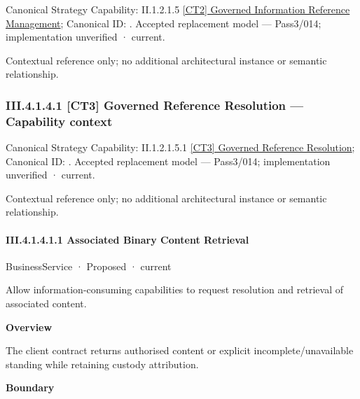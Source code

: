 {\small Canonical Strategy Capability: II.1.2.1.5 \hyperref[element:39205a4164cc4e92b372f182cec834e0]{[CT2] Governed Information Reference Management}; Canonical ID: \texttt{}. Accepted replacement model — Pass3/014; implementation unverified · current.}\par
Contextual reference only; no additional architectural instance or semantic relationship.\par
\subsubsection*{III.4.1.4.1 [CT3] Governed Reference Resolution — Capability context}
\label{navigation:III.4.1.4.1}

{\small Canonical Strategy Capability: II.1.2.1.5.1 \hyperref[element:56183735ff404e0e94d54df936b008cf]{[CT3] Governed Reference Resolution}; Canonical ID: \texttt{}. Accepted replacement model — Pass3/014; implementation unverified · current.}\par
Contextual reference only; no additional architectural instance or semantic relationship.\par
\paragraph*{III.4.1.4.1.1 Associated Binary Content Retrieval}
\label{navigation:III.4.1.4.1.1}

\label{element:f0e0c03e407e4534b9e422df103fc35f}
{\small BusinessService · Proposed · current}\par

Allow information-consuming capabilities to request resolution and retrieval of associated content.



\textbf{Overview}



The client contract returns authorised content or explicit incomplete/unavailable standing while retaining custody attribution.



\textbf{Boundary}



